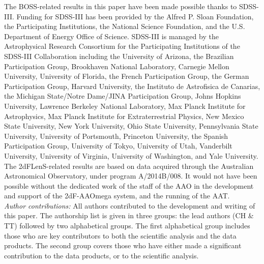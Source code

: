 \documentclass{aa}
\begin{document}
\begin{acknowledgements}
The BOSS-related results in this paper have been made possible thanks to SDSS-III. Funding for SDSS-III has been provided by the Alfred P. Sloan Foundation, the Participating Institutions, the National Science Foundation, and the U.S. Department of Energy Office of Science.   SDSS-III is managed by the Astrophysical Research Consortium for the Participating Institutions of the SDSS-III Collaboration including the University of Arizona, the Brazilian Participation Group, Brookhaven National Laboratory, Carnegie Mellon University, University of Florida, the French Participation Group, the German Participation Group, Harvard University, the Instituto de Astrofisica de Canarias, the Michigan State/Notre Dame/JINA Participation Group, Johns Hopkins University, Lawrence Berkeley National Laboratory, Max Planck Institute for Astrophysics, Max Planck Institute for Extraterrestrial Physics, New Mexico State University, New York University, Ohio State University, Pennsylvania State University, University of Portsmouth, Princeton University, the Spanish Participation Group, University of Tokyo, University of Utah, Vanderbilt University, University of Virginia, University of Washington, and Yale University.\\

The 2dFLenS-related results are based on data acquired through the Australian Astronomical Observatory, under program A/2014B/008. It would not have been possible without the dedicated work of the staff of the AAO in the development and support of the 2dF-AAOmega system, and the running of the AAT.\\

{ {\it Author contributions:}  All authors contributed to the development and writing of this paper.  The authorship list is given in three groups:  the lead authors (CH \& TT) followed by two alphabetical groups.  The first alphabetical group includes those who are key contributors to both the scientific analysis and the data products.  The second group covers those who have either made a significant contribution to the data products, or to the scientific analysis.}
\end{acknowledgements}




\end{document}
